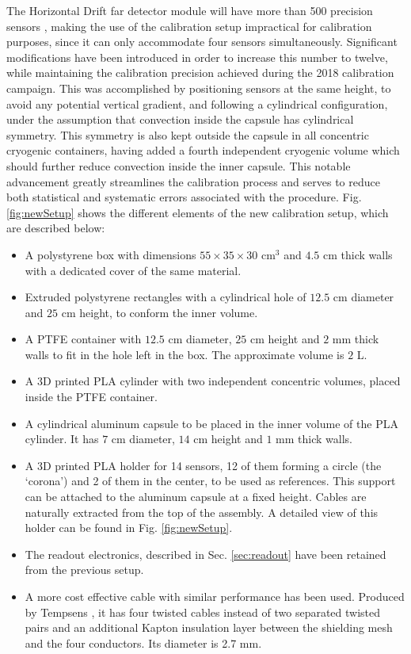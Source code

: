 The Horizontal Drift far detector module will have more than 500 precision sensors \cite{dune_tdr4}, making the use of the calibration setup impractical for calibration purposes, since it can only accommodate four sensors simultaneously. Significant modifications have been introduced in order to increase this number to twelve, while maintaining the calibration precision achieved during the 2018 calibration campaign. This was accomplished by positioning sensors at the same height, to avoid any potential vertical gradient, and following a cylindrical configuration, under the assumption that convection inside the capsule has cylindrical symmetry. 
This symmetry is also kept outside the capsule in all concentric cryogenic containers, having added a fourth independent cryogenic volume which should further reduce convection inside the inner capsule. 
This notable advancement greatly streamlines the calibration process and serves to reduce both statistical and systematic errors associated with the procedure. Fig. \ref{fig:newSetup} shows the different elements of the new calibration setup, which are described below: 

\begin{itemize} 
    \item A polystyrene box with dimensions $55\times35\times30$ cm$^{3}$ and $4.5$ cm thick walls with a dedicated cover of the same material.
    \item Extruded polystyrene rectangles with a cylindrical hole of $12.5$ cm diameter and $25$ cm height, to conform the inner volume.
    \item A PTFE container with $12.5$ cm diameter, $25$ cm height and $2$ mm thick walls to fit in the hole left in the box. The approximate volume is $2$ L.
    \item A 3D printed PLA cylinder with two independent concentric volumes, placed inside the PTFE container.
    \item A cylindrical aluminum capsule to be placed in the inner volume of the PLA cylinder. It has $7$ cm diameter,  $14$ cm height and $1$ mm thick walls.
    \item A 3D printed PLA holder for 14 sensors, 12 of them forming a circle (the `corona') and 2 of them in the center, to be used as references. This support can be attached to the aluminum capsule at a fixed height. Cables are naturally extracted from the top of the assembly. A detailed view of this holder can be found in Fig. \ref{fig:newSetup}. 
    \item The readout electronics, described in Sec. \ref{sec:readout} have been retained from the previous setup. 
    \item A more cost effective cable with similar performance has been used. Produced by Tempsens \cite{tempsens}, it has four twisted cables instead of two separated twisted pairs and an additional Kapton insulation layer between the shielding mesh and the four conductors. Its diameter is 2.7 mm.   
\end{itemize}

